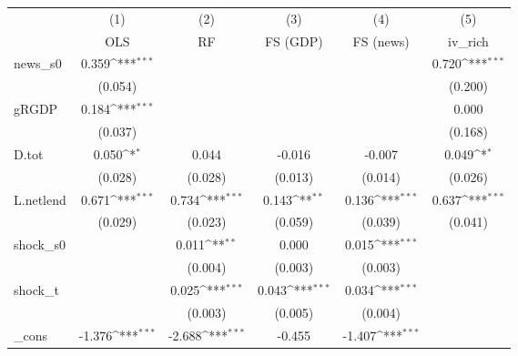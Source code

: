 {
\def\sym#1{\ifmmode^{#1}\else\(^{#1}\)\fi}
\begin{tabular}{l*{5}{c}}
\toprule
            &\multicolumn{1}{c}{(1)}&\multicolumn{1}{c}{(2)}&\multicolumn{1}{c}{(3)}&\multicolumn{1}{c}{(4)}&\multicolumn{1}{c}{(5)}\\
            &\multicolumn{1}{c}{OLS}&\multicolumn{1}{c}{RF}&\multicolumn{1}{c}{FS (GDP)}&\multicolumn{1}{c}{FS (news)}&\multicolumn{1}{c}{iv\_rich}\\
\midrule
news\_s0     &       0.359\sym{***}&                     &                     &                     &       0.720\sym{***}\\
            &     (0.054)         &                     &                     &                     &     (0.200)         \\
\addlinespace
gRGDP       &       0.184\sym{***}&                     &                     &                     &       0.000         \\
            &     (0.037)         &                     &                     &                     &     (0.168)         \\
\addlinespace
D.tot       &       0.050\sym{*}  &       0.044         &      -0.016         &      -0.007         &       0.049\sym{*}  \\
            &     (0.028)         &     (0.028)         &     (0.013)         &     (0.014)         &     (0.026)         \\
\addlinespace
L.netlend   &       0.671\sym{***}&       0.734\sym{***}&       0.143\sym{**} &       0.136\sym{***}&       0.637\sym{***}\\
            &     (0.029)         &     (0.023)         &     (0.059)         &     (0.039)         &     (0.041)         \\
\addlinespace
shock\_s0    &                     &       0.011\sym{**} &       0.000         &       0.015\sym{***}&                     \\
            &                     &     (0.004)         &     (0.003)         &     (0.003)         &                     \\
\addlinespace
shock\_t     &                     &       0.025\sym{***}&       0.043\sym{***}&       0.034\sym{***}&                     \\
            &                     &     (0.003)         &     (0.005)         &     (0.004)         &                     \\
\addlinespace
\_cons      &      -1.376\sym{***}&      -2.688\sym{***}&      -0.455         &      -1.407\sym{***}&                     \\

\end{tabular}}
